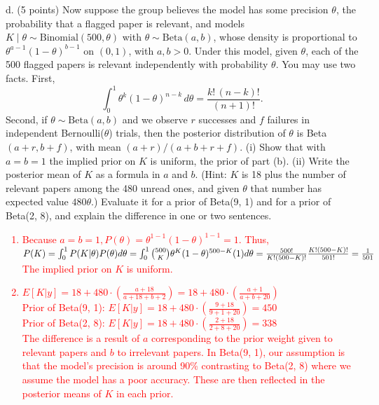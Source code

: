\documentclass[11pt]{article}
\begin{document}
d. (5 points) Now suppose the group believes the model has some precision $\theta$, the probability that a flagged paper is relevant, and models $K\mid\theta\sim\mathrm{Binomial}(500,\theta)$ with $\theta\sim\mathrm{Beta}(a,b)$, whose density is proportional to $\theta^{a-1}(1-\theta)^{b-1}$ on $(0,1)$, with $a,b>0$. Under this model, given $\theta$, each of the 500 flagged papers is relevant independently with probability $\theta$. You may use two facts. First,
\[
\int_0^1\theta^k(1-\theta)^{n-k}\,d\theta=\frac{k!\,(n-k)!}{(n+1)!}.
\]
Second, if $\theta\sim\mathrm{Beta}(a,b)$ and we observe $r$ successes and $f$ failures in independent Bernoulli($\theta$) trials, then the posterior distribution of $\theta$ is Beta$(a+r,b+f)$, with mean $(a+r)/(a+b+r+f)$.
(i) Show that with $a=b=1$ the implied prior on $K$ is uniform, the prior of part (b).  (ii) Write the posterior mean of $K$ as a
formula in $a$ and $b$.  (Hint: $K$ is 18 plus the number of
relevant papers among the 480 unread ones, and given $\theta$ that number has expected value $480\theta$.)  Evaluate it for a prior of Beta(9, 1) and for a prior of Beta(2, 8), and explain the difference in one or two sentences.
\textcolor{red}{
\begin{enumerate}[label=(\roman*)]
    \item 
        Because $a=b=1, P(\theta) = \theta^{1-1}(1-\theta)^{1-1} = 1$. Thus,\\
        $P(K) = \int_0^1 P(K\vert{}\theta)P(\theta) d\theta \\
        = \int_0^1 \binom{500}{K} \theta^K (1-\theta)^{500-K} (1) d\theta\\
        = \frac{500!}{K!(500-K)!} \frac{K!(500-K)!}{501!} = \frac{1}{501}$\\
        The implied prior on $K$ is uniform.
    \item 
        $E[K|y] = 18 + 480 \cdot \left(\frac{a+18}{a+18+b+2} \right) = 18 + 480 \cdot \left(\frac{a+1}{a+b+20}\right)$\\
        Prior of Beta(9, 1): $E[K|y] = 18 + 480 \cdot \left(\frac{9+18}{9+1+20} \right) = 450$\\
        Prior of Beta(2, 8): $E[K|y] = 18 + 480 \cdot \left(\frac{2+18}{2+8+20} \right) = 338$\\
        The difference is a result of $a$ corresponding to the prior weight given to relevant papers and $b$ to irrelevant papers. In Beta(9, 1), our assumption is that the model's precision is around 90\% contrasting to Beta(2, 8) where we assume the model has a poor accuracy. These are then reflected in the posterior means of $K$ in each prior.
\end{enumerate}
}
\end{document}
